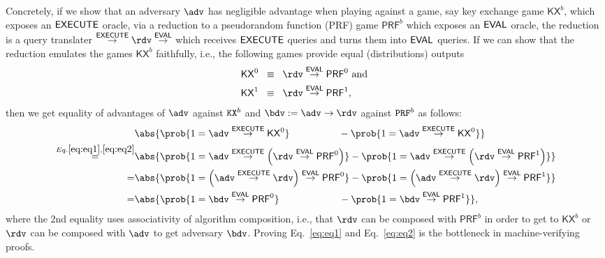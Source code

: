Concretely, if we show that an adversary $\adv$ has negligible advantage when playing against a game, say key exchange game $\mathsf{KX}^b$, which exposes an $\mathsf{EXECUTE}$ oracle, via a reduction to a pseudorandom function (PRF) game $\mathsf{PRF}^b$ which exposes an $\mathsf{EVAL}$ oracle,
the reduction is a query translater $\stackrel{\mathsf{EXECUTE}}{\rightarrow}\rdv\stackrel{\mathsf{EVAL}}{\rightarrow}$ which receives $\mathsf{EXECUTE}$ queries and turns them into $\mathsf{EVAL}$ queries. If we can show that the reduction emulates the games $\mathsf{KX}^b$ faithfully, i.e., the following games provide equal (distributions) outputs
\begin{align}
\mathsf{KX}^0&\;\;\equiv\;\;%
\rdv\stackrel{\mathsf{EVAL}}{\rightarrow}\mathsf{PRF}^0\text{ and }\label{eq:eq1}\\
\mathsf{KX}^1&\;\;\equiv\;\;%
\rdv\stackrel{\mathsf{EVAL}}{\rightarrow}\mathsf{PRF}^1\label{eq:eq2},
\end{align}
then we get equality of advantages of $\adv$ against $\text{\texttt{KX}}^b$ and $\bdv:=\adv\rightarrow\rdv$ against $\text{\texttt{PRF}}^b$ as follows:
\begin{align*}
 &\abs{\prob{1=\adv\stackrel{\mathsf{EXECUTE}}{\rightarrow}\mathsf{KX}^0}
\;\;\;\;\;\;\;\;\;\;\;\;\;\;\;\;\;\;
     -\prob{1=\adv\stackrel{\mathsf{EXECUTE}}{\rightarrow}\mathsf{KX}^0}}\\
\stackrel{Eq.\ref{eq:eq1},\ref{eq:eq2}}{=}
 &\abs{\prob{1=\adv\stackrel{\mathsf{EXECUTE}}{\rightarrow}\left(\rdv\stackrel{\mathsf{EVAL}}{\rightarrow}\mathsf{PRF}^0\right)}
     -\prob{1=\adv\stackrel{\mathsf{EXECUTE}}{\rightarrow}\left(\rdv\stackrel{\mathsf{EVAL}}{\rightarrow}\mathsf{PRF}^1\right)}}\\
=&\abs{\prob{1=\left(\adv\stackrel{\mathsf{EXECUTE}}{\rightarrow}\rdv\right)\stackrel{\mathsf{EVAL}}{\rightarrow}\mathsf{PRF}^0}
     -\prob{1=\left(\adv\stackrel{\mathsf{EXECUTE}}{\rightarrow}\rdv\right)\stackrel{\mathsf{EVAL}}{\rightarrow}\mathsf{PRF}^1}}\\
=&\abs{\prob{1=\bdv\stackrel{\mathsf{EVAL}}{\rightarrow}\mathsf{PRF}^0}
\;\;\;\;\;\;\;\;\;\;\;\;\;\;\;\;\;\;\;\;\;\;
     -\prob{1=\bdv\stackrel{\mathsf{EVAL}}{\rightarrow}\mathsf{PRF}^1}},
\end{align*}
where the 2nd equality uses associativity of algorithm composition, i.e., that $\rdv$ can be composed with $\mathsf{PRF}^b$ in order to get to $\mathsf{KX}^b$ or $\rdv$ can be composed with $\adv$ to get adversary $\bdv$. Proving Eq.~\ref{eq:eq1} and Eq.~\ref{eq:eq2} is the bottleneck in machine-verifying proofs.

